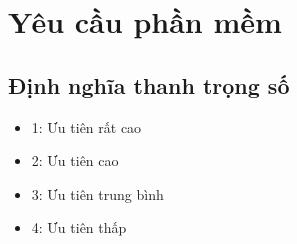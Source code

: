 \documentclass[a4paper, 12pt]{article}
\begin{document}
   \section{Yêu cầu phần mềm}
    \label{sec:requirement}

    \subsection{Định nghĩa thanh trọng số}
    \begin{itemize}
        \item 1: Ưu tiên rất cao 
        \item 2: Ưu tiên cao 
        \item 3: Ưu tiên trung bình 
        \item 4: Ưu tiên thấp 
    \end{itemize}
\end{document}
